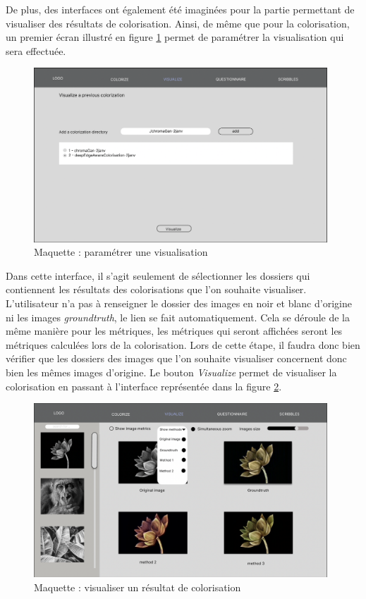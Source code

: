 \documentclass{article}
\begin{document}
De plus, des interfaces ont également été imaginées pour la partie permettant de visualiser des résultats de colorisation.
Ainsi, de même que pour la colorisation, un premier écran illustré en figure \ref{fig:visualiser-choix} permet de paramétrer la visualisation qui sera effectuée.

\begin{figure}[!ht]
    \centering
    \includegraphics[width=11cm]{visualiser-choix.png}
    \caption{Maquette : paramétrer une visualisation}
    \label{fig:visualiser-choix}
\end{figure}

Dans cette interface, il s'agit seulement de sélectionner les dossiers qui contiennent les résultats des colorisations que l'on souhaite visualiser.
L'utilisateur n'a pas à renseigner le dossier des images en noir et blanc d'origine ni les images \textit{groundtruth}, le lien se fait automatiquement.
Cela se déroule de la même manière pour les métriques, les métriques qui seront affichées seront les métriques calculées lors de la colorisation. Lors de cette étape, il faudra donc bien
vérifier que les dossiers des images que l'on souhaite visualiser concernent donc bien les mêmes images d'origine.
Le bouton \textit{Visualize} permet de visualiser la colorisation en passant à l'interface représentée dans la figure \ref{fig:visualiser-comparaison3}.

\begin{figure}[!ht]
    \centering
    \includegraphics[width=11cm]{visualiser-comparaison3.png}
    \caption{Maquette : visualiser un résultat de colorisation}
    \label{fig:visualiser-comparaison3}
\end{figure}
\end{document}
